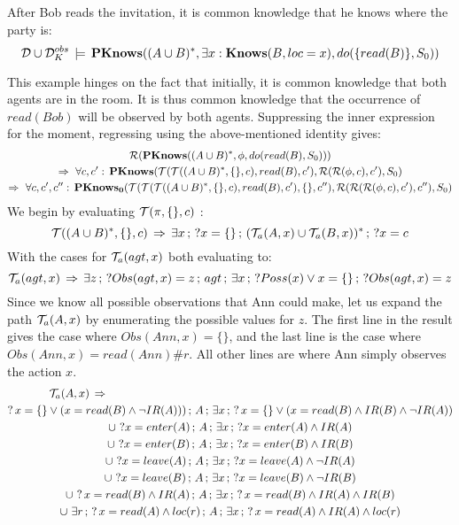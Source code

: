 \begin{example}
After Bob reads the invitation, it is common knowledge that he knows
where the party is:\[
\mathcal{D}\cup\mathcal{D}_{K}^{obs}\,\models\,\mathbf{PKnows}((A\cup B)^{*},\exists x:\mathbf{Knows}(B,loc=x),do(\{read(B)\},S_{0}))\]

\end{example}
This example hinges on the fact that initially, it is common knowledge
that both agents are in the room. It is thus common knowledge that
the occurrence of $read(Bob)$ will be observed by both agents. Suppressing
the inner expression for the moment, regressing using the above-mentioned
identity gives:\begin{multline*}
\mathcal{R}(\mathbf{PKnows}((A\cup B)^{*},\phi,do(read(B),S_{0})))\\
\Rightarrow\,\,\forall c,c':\,\mathbf{PKnows}(\mathcal{T}(\mathcal{T}((A\cup B)^{*},\{\},c),read(B),c'),\mathcal{R}(\mathcal{R}(\phi,c),c'),S_{0})\\
\Rightarrow\,\,\forall c,c',c'':\,\mathbf{PKnows_{0}}(\mathcal{T}(\mathcal{T}(\mathcal{T}((A\cup B)^{*},\{\},c),read(B),c'),\{\},c''),\mathcal{R}(\mathcal{R}(\mathcal{R}(\phi,c),c'),c''),S_{0})\end{multline*}
 We begin by evaluating $\mathcal{T}(\pi,\{\},c)$ :\[
\mathcal{T}((A\cup B)^{*},\{\},c)\,\Rightarrow\,\exists x\,;\,?x=\{\}\,;\,(\mathcal{T}_{a}(A,x)\cup\mathcal{T}_{a}(B,x))^{*}\,;\,?x=c\]
 With the cases for $\mathcal{T}_{a}(agt,x)$ both evaluating to:\[
\mathcal{T}_{a}(agt,x)\,\Rightarrow\,\exists z\,;\,?Obs(agt,x)=z\,;\, agt\,;\,\exists x\,;\,?Poss(x)\vee x=\{\}\,;\,?Obs(agt,x)=z\]
 Since we know all possible observations that Ann could make, let
us expand the path $\mathcal{T}_{a}(A,x)$ by enumerating the possible values
for $z$. The first line in the result gives the case where $Obs(Ann,x)=\{\}$,
and the last line is the case where $Obs(Ann,x)=read(Ann)\#r$. All
other lines are where Ann simply observes the action $x$. \begin{gather*}
\mathcal{T}_{a}(A,x)\,\Rightarrow\,\,\,\,\,\,\,\,\,\,\,\,\,\,\,\,\,\,\,\,\,\,\,\,\,\,\,\,\,\,\,\,\,\,\,\,\,\,\,\,\,\,\,\,\,\,\,\,\,\,\,\,\,\,\,\,\,\,\,\,\,\,\,\,\,\,\,\,\,\,\,\,\,\,\,\,\,\,\,\,\,\,\,\,\,\,\,\,\,\,\,\,\,\,\,\,\,\,\,\,\,\,\,\,\,\,\,\,\,\,\,\,\,\,\,\,\,\,\,\,\,\,\,\,\,\,\,\,\,\,\,\,\,\,\,\,\,\,\,\,\,\,\,\,\,\,\,\,\,\,\,\,\,\,\,\,\,\,\,\,\,\,\,\\
?\, x=\{\}\vee(x=read(B)\wedge\neg IR(A)))\,;\, A\,;\,\exists x\,;\,?\, x=\{\}\vee(x=read(B)\wedge IR(B)\wedge\neg IR(A))\\
\cup\,\,?x=enter(A)\,;\, A\,;\,\exists x\,;\,?x=enter(A)\wedge IR(A)\\
\cup\,\,?x=enter(B)\,;\, A\,;\,\exists x\,;\,?x=enter(B)\wedge IR(B)\\
\cup\,\,?x=leave(A)\,;\, A\,;\,\exists x\,;\,?x=leave(A)\wedge\neg IR(A)\\
\cup\,\,?x=leave(B)\,;\, A\,;\,\exists x\,;\,?x=leave(B)\wedge\neg IR(B)\\
\cup\,\,?\, x=read(B)\wedge IR(A)\,;\, A\,;\,\exists x\,;\,?\, x=read(B)\wedge IR(A)\wedge IR(B)\\
\cup\,\,\exists r\,;\,?\, x=read(A)\wedge loc(r)\,;\, A\,;\,\exists x\,;\,?\, x=read(A)\wedge IR(A)\wedge loc(r)\end{gather*}
